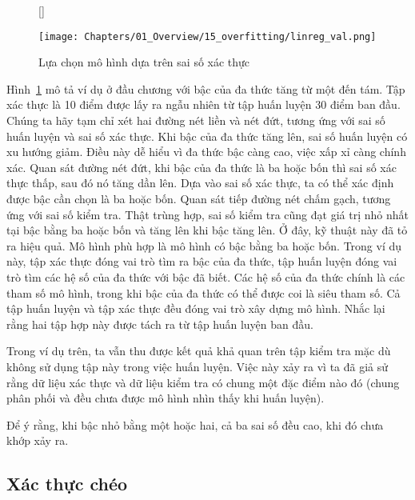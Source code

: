 \begin{figure}[t]
[\FBwidth]
{\caption{
Lựa chọn mô hình dựa trên sai số xác thực
}
\label{fig:15_validerror}}
{ %
\texttt{[image: Chapters/01\_Overview/15\_overfitting/linreg\_val.png]}
}
\end{figure}
Hình~\ref{fig:15_validerror} mô tả ví dụ ở đầu chương với bậc của đa thức tăng
từ một đến tám. Tập xác thực là 10 điểm được lấy ra ngẫu nhiên từ tập huấn luyện
30 điểm ban đầu. Chúng ta hãy tạm chỉ xét hai đường nét liền và nét đứt, tương
ứng với {sai số huấn luyện} và {sai số xác thực}. Khi bậc của đa thức tăng lên,
{sai số huấn luyện} có xu hướng giảm. Điều này dễ hiểu vì đa thức bậc càng cao,
việc xấp xỉ càng chính xác. Quan sát đường nét đứt, khi bậc của đa thức là ba
hoặc bốn thì {sai số xác thực} thấp, sau đó nó tăng dần lên. Dựa vào
{sai số xác thực}, ta có thể xác định được bậc cần chọn là ba hoặc bốn. Quan
sát tiếp đường nét chấm gạch, tương ứng với {sai số kiểm tra}. Thật trùng hợp, sai số kiểm tra cũng đạt giá trị nhỏ nhất tại bậc bằng ba hoặc bốn và tăng lên khi bậc
tăng lên. Ở đây, kỹ thuật này đã tỏ ra hiệu quả. Mô hình phù hợp là mô hình có
bậc bằng ba hoặc bốn. Trong ví dụ này, tập xác thực đóng vai trò tìm ra bậc
của đa thức, tập huấn luyện đóng vai trò tìm các hệ số của đa thức
với bậc đã biết. Các hệ số của đa thức chính là các tham số mô hình,
trong khi bậc của đa thức có thể được coi là {siêu tham số}. Cả tập
huấn luyện và tập xác thực đều đóng vai trò xây dựng mô hình. Nhắc lại rằng
hai tập hợp này được tách ra từ tập huấn luyện ban đầu.

Trong ví dụ trên, ta vẫn thu được kết quả khả quan trên tập kiểm tra mặc dù không sử dụng tập này trong việc huấn luyện. Việc này xảy ra vì ta đã giả sử rằng dữ liệu xác thực và dữ liệu kiểm tra
có chung một đặc điểm nào đó (chung phân phối và đều chưa được mô hình nhìn thấy
khi huấn luyện).

Để ý rằng, khi bậc nhỏ bằng một hoặc hai, cả ba sai số đều cao, khi đó chưa khớp xảy ra.



\subsection{Xác thực chéo}
\label{ssec:crosvalid}

